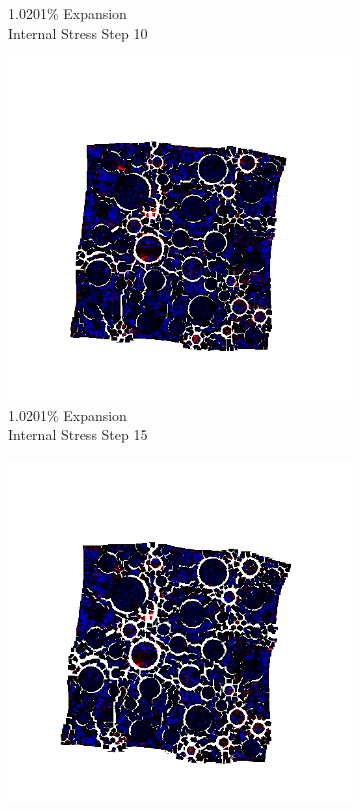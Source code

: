 \begin{figure}[ht!]
\begin{subfigure}{.25\textwidth}
      \caption{1.0201\% Expansion\\Internal Stress Step 10}
    \end{subfigure}%
    \begin{subfigure}{.25\textwidth}
      \centering
      \includegraphics[width=1.0\linewidth]{Files/exp_3D/ASR/A30P25_4_s15.png}
      \caption{1.0201\% Expansion\\Internal Stress Step 15}
    \end{subfigure}%
    \begin{subfigure}{.25\textwidth}
      \centering
      \includegraphics[width=1.0\linewidth]{Files/exp_3D/ASR/A30P25_4_stress.png}

\end{subfigure}
\end{figure}
